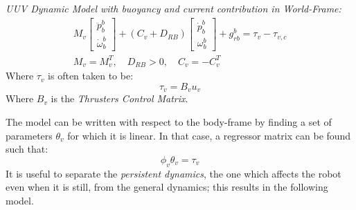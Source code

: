 \begin{definition}
    \textit{UUV Dynamic Model with buoyancy and current contribution in World-Frame:}
    \begin{gather}
        M_v
        \begin{bmatrix}
            \ddot{p}_b^b\\ \dot{\omega}_b^b
        \end{bmatrix}+(C_v+D_{RB})
        \begin{bmatrix}
            \dot{p}_b^b\\ \omega_b^b
        \end{bmatrix}+g_{rb}^b=\tau_v-\tau_{v,c}\\
        M_v=M_v^T,\quad D_{RB}>0,\quad C_v=-C_v^T
    \end{gather}
    Where $\tau_v$ is often taken to be:
    \begin{equation}
        \tau_v=B_vu_v
    \end{equation}
    Where $B_v$ is the \textit{Thrusters Control Matrix}.
\end{definition}
The model can be written with respect to the body-frame by finding a set of parameters $\theta_v$ for which it is linear. In that case, a regressor matrix can be found such that:
\begin{equation*}
    \phi_v\theta_v=\tau_v
\end{equation*}
It is useful to separate the \textit{persistent dynamics}, the one which affects the robot even when it is still, from the general dynamics; this results in the following model.
